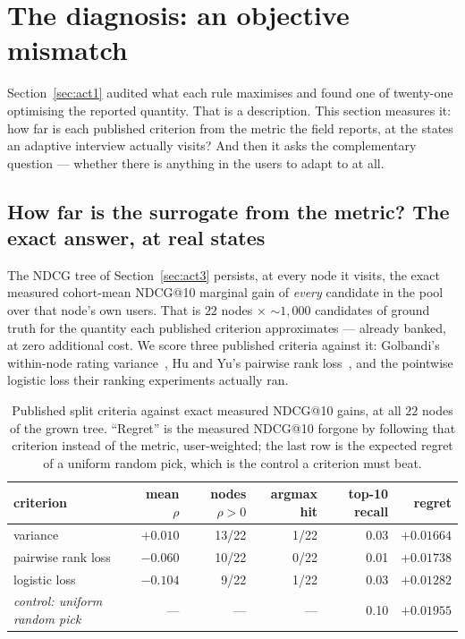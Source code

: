 \documentclass[11pt]{article}
\begin{document}
\section{The diagnosis: an objective mismatch}
\label{sec:act2}

Section~\ref{sec:act1} audited what each rule maximises and found one of twenty-one optimising the reported quantity.
That is a description. This section measures it: how far is each published criterion from the metric
the field reports, at the states an adaptive interview actually visits? And then it asks the
complementary question --- whether there is anything in the users to adapt to at all.

\subsection{How far is the surrogate from the metric? The exact answer, at real states}
\label{sec:surrogategap}

The NDCG tree of Section~\ref{sec:act3} persists, at every node it visits, the exact measured
cohort-mean NDCG@10 marginal gain of \emph{every} candidate in the pool over that node's own users.
That is $22$ nodes $\times$ $\sim\!1{,}000$ candidates of ground truth for the quantity each published
criterion approximates --- already banked, at zero additional cost. We score three published criteria
against it: Golbandi's within-node rating variance~\cite{golbandi2011adaptive}, Hu and Yu's pairwise
rank loss~\cite{hu2013interview}, and the pointwise logistic loss their ranking experiments actually
ran.

\begin{table}[h]
\centering
\caption{Published split criteria against exact measured NDCG@10 gains, at all $22$ nodes of the
grown tree. ``Regret'' is the measured NDCG@10 forgone by following that criterion instead of the
metric, user-weighted; the last row is the expected regret of a uniform random pick, which is the
control a criterion must beat.}
\label{tab:criterionregret}
\small
\begin{tabular}{lrrrrr}
\toprule
criterion & mean $\rho$ & nodes $\rho{>}0$ & argmax hit & top-10 recall & regret \\
\midrule
variance~\cite{golbandi2011adaptive} & $+0.010$ & 13/22 & 1/22 & 0.03 & $+0.01664$ \\
pairwise rank loss~\cite{hu2013interview} & $-0.060$ & 10/22 & 0/22 & 0.01 & $+0.01738$ \\
logistic loss~\cite{hu2013interview} & $-0.104$ & 9/22 & 1/22 & 0.03 & $+0.01282$ \\
\midrule
\emph{control: uniform random pick} & --- & --- & --- & 0.10 & $+0.01955$ \\
\bottomrule
\end{tabular}
\end{table}
\end{document}
